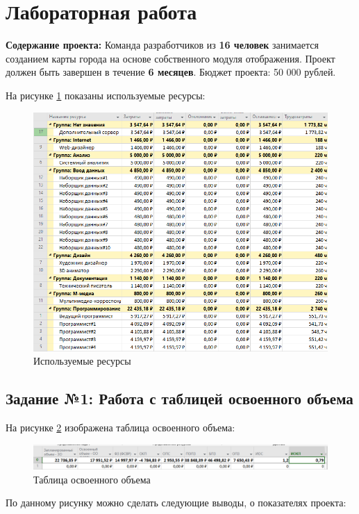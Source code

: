\section*{Лабораторная работа}
\textbf{Содержание проекта:} Команда разработчиков из \textbf{16 человек} занимается созданием карты города на основе собственного модуля отображения. Проект должен быть завершен в течение \textbf{6 месяцев}. Бюджет проекта: 50 000 рублей.

На рисунке \ref{p0} показаны используемые ресурсы:
\begin{figure}[!h]
	\centering
	\includegraphics[width=1\linewidth]{inc/img/0.png}
	\caption{Используемые ресурсы}
	\label{p0}
\end{figure}

\newpage
\subsection*{Задание №1: Работа с таблицей освоенного объема}
На рисунке \ref{p1} изображена таблица освоенного объема:
\begin{figure}[!h]
	\centering
	\includegraphics[width=1\linewidth]{inc/img/1.png}
	\caption{Таблица освоенного объема}
	\label{p1}
\end{figure}

По данному рисунку можно сделать следующие выводы, о показателях проекта:

